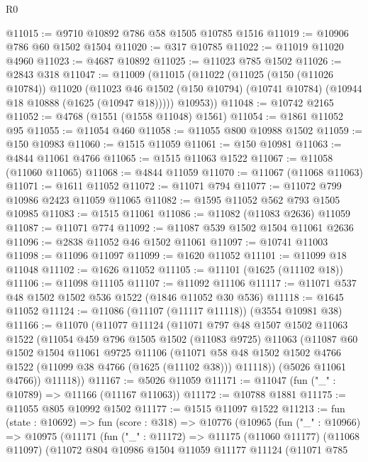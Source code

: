 \begin{lexlean}{R0}
\begin{coremodule}
@11015 := @9710 @10892 @786 @58 @1505 @10785 @1516
@11019 := @10906 @786 @60 @1502 @1504
@11020 := @317 @10785
@11022 := @11019 @11020 @4960
@11023 := @4687 @10892
@11025 := @11023 @785 @1502
@11026 := @2843 @318
@11047 := @11009
    (@11015
      (@11022
        (@11025
          (@150 (@11026 @10784))
          @11020
          (@11023 @46 @1502 (@150 @10794) (@10741 @10784) (@10944 @18 @10888 (@1625 (@10947 @18)))))
        @10953))
@11048 := @10742 @2165
@11052 := @4768 (@1551 (@1558 @11048) @1561)
@11054 := @1861 @11052 @95
@11055 := @11054 @460
@11058 := @11055 @800 @10988 @1502
@11059 := @150 @10983
@11060 := @1515 @11059
@11061 := @150 @10981
@11063 := @4844 @11061 @4766
@11065 := @1515 @11063 @1522
@11067 := @11058 (@11060 @11065)
@11068 := @4844 @11059
@11070 := @11067 (@11068 @11063)
@11071 := @1611 @11052
@11072 := @11071 @794
@11077 := @11072 @799 @10986 @2423 @11059 @11065
@11082 := @1595 @11052 @562 @793 @1505 @10985
@11083 := @1515 @11061
@11086 := @11082 (@11083 @2636) @11059
@11087 := @11071 @774
@11092 := @11087 @539 @1502 @1504 @11061 @2636
@11096 := @2838 @11052 @46 @1502 @11061
@11097 := @10741 @11003
@11098 := @11096 @11097
@11099 := @1620 @11052
@11101 := @11099 @18 @11048
@11102 := @1626 @11052
@11105 := @11101 (@1625 (@11102 @18))
@11106 := @11098 @11105
@11107 := @11092 @11106
@11117 := @11071 @537 @48 @1502 @1502 @536 @1522 (@1846 @11052 @30 @536)
@11118 := @1645 @11052
@11124 := @11086 (@11107 (@11117 @11118)) (@3554 @10981 @38)
@11166 := @11070
    (@11077
      @11124
      (@11071
        @797
        @48
        @1507
        @1502
        @11063
        @1522
        (@11054
          @459
          @796
          @1505
          @1502
          (@11083 @9725)
          @11063
          (@11087
            @60
            @1502
            @1504
            @11061
            @9725
            @11106
            (@11071 @58 @48 @1502 @1502 @4766 @1522 (@11099 @38 @4766 (@1625 (@11102 @38))) @11118))
          (@5026 @11061 @4766))
        @11118))
@11167 := @5026 @11059
@11171 := @11047 (fun ("_" : @10789) => @11166 (@11167 @11063))
@11172 := @10788 @1881
@11175 := @11055 @805 @10992 @1502
@11177 := @1515 @11097 @1522
@11213 := fun (state : @10692) =>
  fun (score : @318) =>
  @10776
    (@10965
      (fun ("_" : @10966) =>
      @10975
        (@11171
          (fun ("_" : @11172) =>
          @11175
            (@11060 @11177)
            (@11068 @11097)
            (@11072
              @804
              @10986
              @1504
              @11059
              @11177
              @11124
              (@11071
                @785

\end{coremodule}
\end{lexlean}
